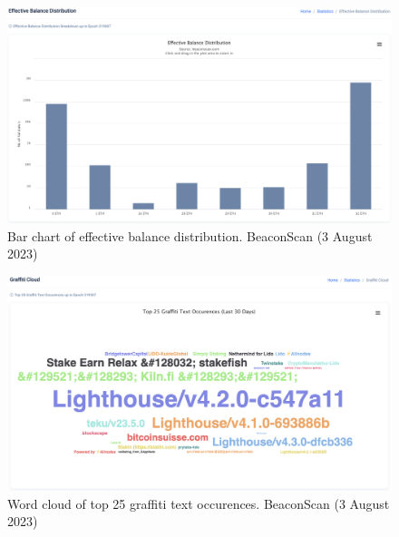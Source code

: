 \documentclass[UTF8]{article}
\begin{document}
\begin{figure}[htbp]
\begin{center}
\includegraphics[width=\linewidth]{images/beaconscan16}
\caption{Bar chart of effective balance distribution. BeaconScan (3 August 2023)}
\label{fig:beaconscan16}
\end{center}
\end{figure}

\begin{figure}[htbp]
\begin{center}
\includegraphics[width=\linewidth]{images/beaconscan17}
\caption{Word cloud of top 25 graffiti text occurences. BeaconScan (3 August 2023)}
\label{fig:beaconscan17}
\end{center}
\end{figure}
\end{document}
